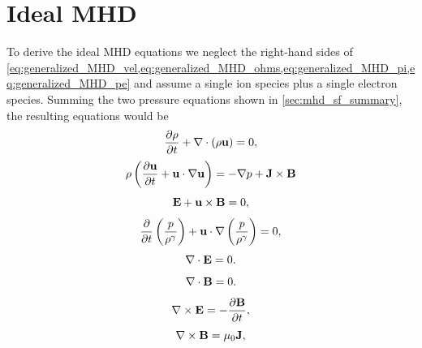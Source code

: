 \documentclass[a4paper,11pt]{report}
\begin{document}
\section{Ideal MHD}
To derive the ideal MHD equations we neglect the right-hand sides of \cref{eq:generalized_MHD_vel,eq:generalized_MHD_ohms,eq:generalized_MHD_pi,eq:generalized_MHD_pe} and assume a single ion species plus a single electron species. Summing the two pressure equations shown in \cref{sec:mhd_sf_summary}, the resulting equations would be
\begin{equation}
    \frac{\partial \rho}{\partial t} + \nabla \cdot (\rho \mathbf{u}) = 0,
\end{equation}
\begin{equation}
    \rho \left (\frac{\partial \mathbf{u}}{\partial t} + \mathbf{u} \cdot \nabla \mathbf{u} \right ) = - \nabla p  + \mathbf{J} \times \mathbf{B}
\end{equation}
\begin{equation}
    \mathbf{E} + \mathbf{u} \times \mathbf{B} = 0,
\end{equation}
\begin{equation}
    \frac{\partial}{\partial t} \left ( \frac{p}{\rho^\gamma} \right ) + \mathbf{u} \cdot \nabla \left (\frac{p}{\rho^\gamma} \right ) = 0,
\end{equation}
\begin{equation}
    \nabla \cdot \mathbf{E} = 0.
\end{equation}
\begin{equation}
    \nabla \cdot \mathbf{B} = 0.
\end{equation}
\begin{equation}
    \nabla \times \mathbf{E} = -\frac{ \partial \mathbf{B}}{\partial t},
\end{equation}
\begin{equation}
    \nabla \times \mathbf{B} = \mu_0 \mathbf{J} ,
\end{equation}
\end{document}
